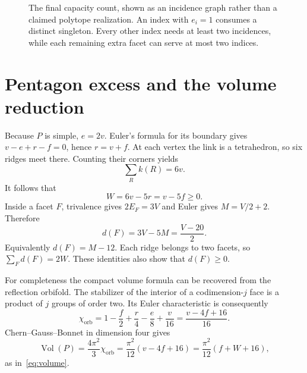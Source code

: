 \documentclass[11pt]{article}
\theoremstyle{remark}
\newcommand{\Vol}{\operatorname{Vol}}
\begin{document}
\begin{figure}[tb]
\centering
{}
\caption{The final capacity count, shown as an incidence graph rather
than a claimed polytope realization. An index with $e_i=1$ consumes a
distinct singleton. Every other index needs at least two incidences,
while each remaining extra facet can serve at most two indices.}
\label{fig:capacity}
\end{figure}

\section{Pentagon excess and the volume reduction}

Because $P$ is simple, $e=2v$. Euler's formula for its boundary gives
$v-e+r-f=0$, hence $r=v+f$. At each vertex the link is a tetrahedron,
so six ridges meet there. Counting their corners yields
\[
 \sum_R k(R)=6v.
\]
It follows that
\[
 W=6v-5r=v-5f\ge0.
\]
Inside a facet $F$, trivalence gives $2E_F=3V$ and Euler gives
$M=V/2+2$. Therefore
\begin{equation}\label{eq:facet-excess}
 d(F)=3V-5M=\frac{V-20}{2}.
\end{equation}
Equivalently $d(F)=M-12$. Each ridge belongs to two facets, so
$\sum_Fd(F)=2W$. These identities also show that $d(F)\ge0$.

For completeness the compact volume formula can be recovered from the
reflection orbifold. The stabilizer of the interior of a codimension-$j$
face is a product of $j$ groups of order two. Its Euler characteristic
is consequently
\[
 \chi_{\mathrm{orb}}
 =1-\frac f2+\frac r4-\frac e8+\frac v{16}
 =\frac{v-4f+16}{16}.
\]
Chern--Gauss--Bonnet in dimension four gives
\[
 \Vol(P)=\frac{4\pi^2}{3}\chi_{\mathrm{orb}}
 =\frac{\pi^2}{12}(v-4f+16)
 =\frac{\pi^2}{12}(f+W+16),
\]
as in~\eqref{eq:volume}.
\end{document}
